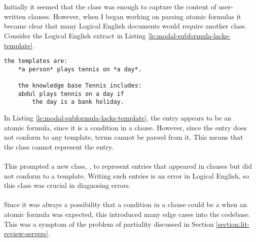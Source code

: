 \documentclass[../main.tex]{subfiles}
\begin{document}
\\
\\
Initially it seemed that the  class was enough to capture the content of user-written clauses. However, when I began working on parsing atomic formulas it became clear that many Logical English documents would require another class. Consider the Logical English extract in Listing \ref{le:modal-subformula-lacks-template}.
\begin{lstlisting}[language={LE}, caption={An extract of a Logical English document in which the condition of a clause does not have any matching template. Because of this, the \codeword{AtomicFormula} class can properly represent the argument atomic formula.}, label={le:modal-subformula-lacks-template}]
    the templates are:
    *a person* plays tennis on *a day*.

    the knowledge base Tennis includes:
    abdul plays tennis on a day if
        the day is a bank holiday.
\end{lstlisting}
In Listing \ref{le:modal-subformula-lacks-template}, the entry  appears to be an atomic formula, since it is a condition in a clause. However, since the entry does not conform to any template, terms cannot be parsed from it. This means that the  class cannot represent the entry.
\\
\\
This prompted a new class, , to represent entries that appeared in clauses but did not conform to a template. Writing such entries is an error in Logical English, so this class was crucial in diagnosing errors. 
\\
\\
Since it was always a possibility that a condition in a clause could be a  when an atomic formula was expected, this introduced many edge cases into the codebase. This was a symptom of the problem of partiality discussed in Section \ref{section:lit-review-servers}.
\end{document}
